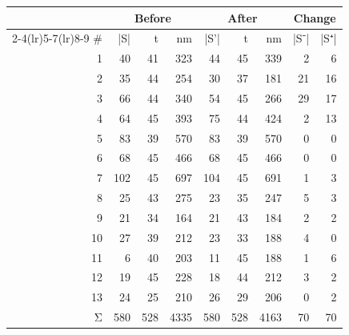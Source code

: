 \begin{tabular}{rrrrrrrrr}
\toprule
\multicolumn{1}{c}{} & \multicolumn{3}{c}{Before} & \multicolumn{3}{c}{After} & \multicolumn{2}{c}{Change} \\
\cmidrule(lr){2-4}\cmidrule(lr){5-7}\cmidrule(lr){8-9}
# & |S| & t & nm & |S'| & t & nm & |S⁻| & |S⁺|
\\
\midrule
\rowcolor{seg1!30} 1 & 40 & 41 & 323 & 44 & 45 & 339 & 2 & 6 \\
\rowcolor{seg2!30} 2 & 35 & 44 & 254 & 30 & 37 & 181 & 21 & 16 \\
\rowcolor{seg3!30} 3 & 66 & 44 & 340 & 54 & 45 & 266 & 29 & 17 \\
\rowcolor{seg4!30} 4 & 64 & 45 & 393 & 75 & 44 & 424 & 2 & 13 \\
\rowcolor{seg5!30} 5 & 83 & 39 & 570 & 83 & 39 & 570 & 0 & 0 \\
\rowcolor{seg6!30} 6 & 68 & 45 & 466 & 68 & 45 & 466 & 0 & 0 \\
\rowcolor{seg7!30} 7 & 102 & 45 & 697 & 104 & 45 & 691 & 1 & 3 \\
\rowcolor{seg8!30} 8 & 25 & 43 & 275 & 23 & 35 & 247 & 5 & 3 \\
\rowcolor{seg9!30} 9 & 21 & 34 & 164 & 21 & 43 & 184 & 2 & 2 \\
\rowcolor{seg10!30} 10 & 27 & 39 & 212 & 23 & 33 & 188 & 4 & 0 \\
\rowcolor{seg11!30} 11 & 6 & 40 & 203 & 11 & 45 & 188 & 1 & 6 \\
\rowcolor{seg12!30} 12 & 19 & 45 & 228 & 18 & 44 & 212 & 3 & 2 \\
\rowcolor{seg13!30} 13 & 24 & 25 & 210 & 26 & 29 & 206 & 0 & 2 \\
\rowcolor{gray!15} Σ & 580 & 528 & 4335 & 580 & 528 & 4163 & 70 & 70 \\
\bottomrule
\end{tabular}
